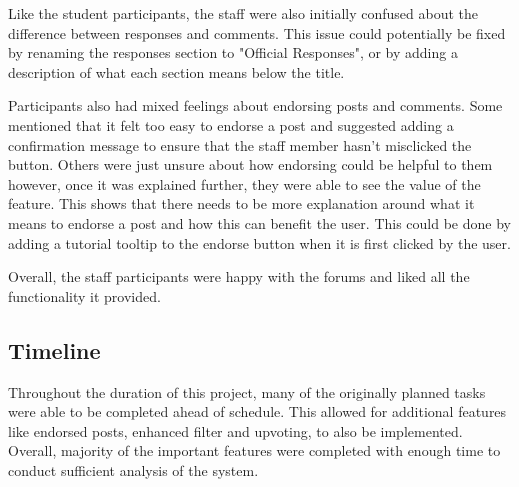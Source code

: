 Like the student participants, the staff were also initially confused about the difference between responses and comments.
This issue could potentially be fixed by renaming the responses section to "Official Responses", or by adding a description of what each section means below the title.

Participants also had mixed feelings about endorsing posts and comments.
Some mentioned that it felt too easy to endorse a post and suggested adding a confirmation message to ensure that the staff member hasn't misclicked the button.
Others were just unsure about how endorsing could be helpful to them however, once it was explained further, they were able to see the value of the feature.
This shows that there needs to be more explanation around what it means to endorse a post and how this can benefit the user.
This could be done by adding a tutorial tooltip to the endorse button when it is first clicked by the user.

Overall, the staff participants were happy with the forums and liked all the functionality it provided.

\subsection{Timeline}

Throughout the duration of this project, many of the originally planned tasks were able to be completed ahead of schedule.
This allowed for additional features like endorsed posts, enhanced filter and upvoting, to also be implemented.
Overall, majority of the important features were completed with enough time to conduct sufficient analysis of the system.